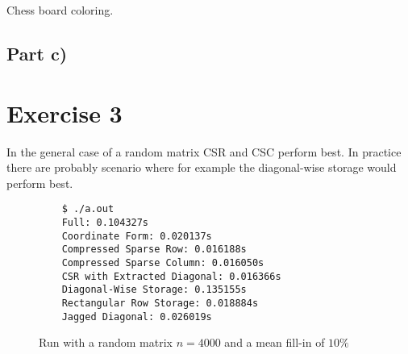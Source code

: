 \documentclass[10pt,a4paper]{article}
\begin{document}
Chess board coloring.

\subsection*{Part c)}

\section*{Exercise 3}

In the general case of a random matrix CSR and CSC perform best.
In practice there are probably scenario where for example the diagonal-wise storage would perform best.

\begin{figure}[h]
  \centering
  \begin{verbatim}
    $ ./a.out
    Full: 0.104327s
    Coordinate Form: 0.020137s
    Compressed Sparse Row: 0.016188s
    Compressed Sparse Column: 0.016050s
    CSR with Extracted Diagonal: 0.016366s
    Diagonal-Wise Storage: 0.135155s
    Rectangular Row Storage: 0.018884s
    Jagged Diagonal: 0.026019s
  \end{verbatim}
  \caption{Run with a random matrix $n = 4000$ and a mean fill-in of $10\%$}
  \label{fig:}
\end{figure}
\end{document}
